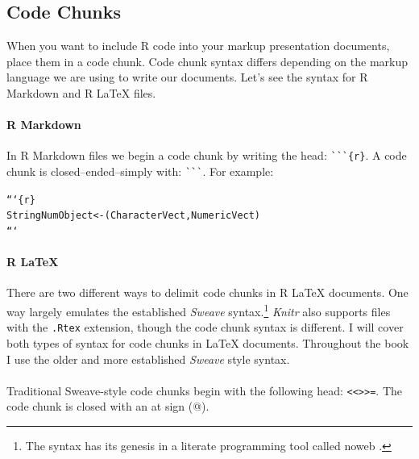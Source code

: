 \documentclass[krantz1]{krantz}
\begin{document}
\subsection{Code Chunks}

When you want to include R code into your markup presentation documents, place them in a code chunk. Code chunk syntax differs depending on the markup language we are using to write our documents. Let's see the syntax for R Markdown and R LaTeX files.

\paragraph{R Markdown}

In R Markdown files we begin a code chunk by writing the head: \verb|```{r}|. A code chunk is closed--ended--simply with: \verb|```|. For example:

\begin{knitrout}
\color{fgcolor}\begin{kframe}
\begin{alltt}
```\{r\}
StringNumObject <- (CharacterVect, NumericVect)
```
\end{alltt}
\end{kframe}
\end{knitrout}


\paragraph{R LaTeX}

There are two different ways to delimit code chunks in R LaTeX documents. One way largely emulates the established {\emph{Sweave}} syntax.\footnote{The syntax has its genesis in a literate programming tool called noweb \cite[]{Leisch2002,RamseyNoweb}.} {\emph{Knitr}} also supports files with the {\tt{.Rtex}} extension, though the code chunk syntax is different. I will cover both types of syntax for code chunks in LaTeX documents. Throughout the book I use the older and more established {\emph{Sweave}} style syntax. \\[0.25cm]

 \\[0.25cm]

Traditional Sweave-style code chunks begin with the following head: \texttt{\textless\textless \textgreater\textgreater=}. The code chunk is closed with an at sign (@).
\end{document}
